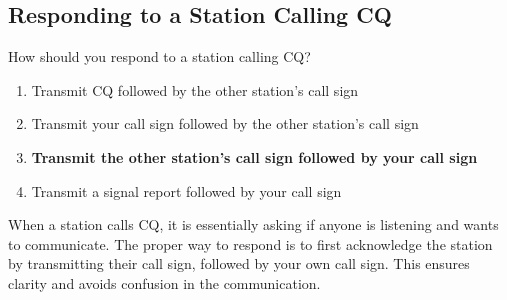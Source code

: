 \subsection{Responding to a Station Calling CQ}
\label{T2A05}

\begin{tcolorbox}[colback=gray!10!white,colframe=black!75!black,title=T2A05]
How should you respond to a station calling CQ?
\begin{enumerate}[noitemsep]
    \item Transmit CQ followed by the other station’s call sign
    \item Transmit your call sign followed by the other station’s call sign
    \item \textbf{Transmit the other station’s call sign followed by your call sign}
    \item Transmit a signal report followed by your call sign
\end{enumerate}
\end{tcolorbox}

When a station calls CQ, it is essentially asking if anyone is listening and wants to communicate. The proper way to respond is to first acknowledge the station by transmitting their call sign, followed by your own call sign. This ensures clarity and avoids confusion in the communication.